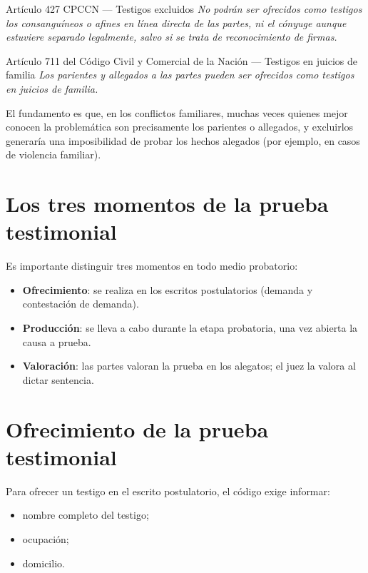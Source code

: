 \documentclass[12pt,oneside]{book}
\begin{document}
\begin{norma}{Artículo 427 CPCCN --- Testigos excluidos}
\textit{No podrán ser ofrecidos como testigos los consanguíneos o afines en línea directa de las partes, ni el cónyuge aunque estuviere separado legalmente, salvo si se trata de reconocimiento de firmas.}
\end{norma}

\begin{norma}{Artículo 711 del Código Civil y Comercial de la Nación --- Testigos en juicios de familia}
\textit{Los parientes y allegados a las partes pueden ser ofrecidos como testigos en juicios de familia.}

El fundamento es que, en los conflictos familiares, muchas veces quienes mejor conocen la problemática son precisamente los parientes o allegados, y excluirlos generaría una imposibilidad de probar los hechos alegados (por ejemplo, en casos de violencia familiar).
\end{norma}

\section{Los tres momentos de la prueba testimonial}

Es importante distinguir tres momentos en todo medio probatorio:
\begin{itemize}
    \item \textbf{Ofrecimiento}: se realiza en los escritos postulatorios (demanda y contestación de demanda).
    \item \textbf{Producción}: se lleva a cabo durante la etapa probatoria, una vez abierta la causa a prueba.
    \item \textbf{Valoración}: las partes valoran la prueba en los alegatos; el juez la valora al dictar sentencia.
\end{itemize}

\section{Ofrecimiento de la prueba testimonial}

Para ofrecer un testigo en el escrito postulatorio, el código exige informar:
\begin{itemize}
    \item nombre completo del testigo;
    \item ocupación;
    \item domicilio.
\end{itemize}
\end{document}
